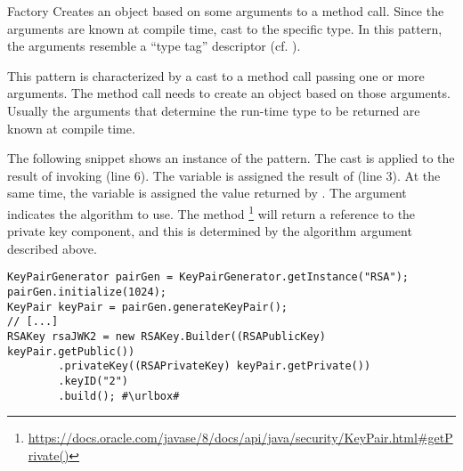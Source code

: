 \begin{pattern}{Factory}
Creates an object based on some arguments to a method call.
Since the arguments are known at compile time, cast to the specific type.
In this pattern, the arguments resemble a ``type tag'' descriptor (cf.
).

This pattern is characterized by a cast to a method call passing one or more arguments.
The method call needs to create an object based on those arguments.
Usually the arguments that determine the run-time type to be returned are known at compile time.

\instances{}
The following snippet
shows an instance of the \thisp{} pattern.
The cast is applied to the result of invoking 
(line 6).
The variable  is assigned the result of  (line 3).
At the same time, the  variable is assigned the value returned by .
The argument  indicates the algorithm to use.
The method%
\footnote{\url{https://docs.oracle.com/javase/8/docs/api/java/security/KeyPair.html\#getPrivate()}}
will return a reference to the private key component,
and this is determined by the algorithm argument described above.

\def\urlvar{http://bit.ly/connect2id_oauth_2_0_sdk_with_2HvRlUX}
\begin{verbatim}
KeyPairGenerator pairGen = KeyPairGenerator.getInstance("RSA");
pairGen.initialize(1024);
KeyPair keyPair = pairGen.generateKeyPair();
// [...]
RSAKey rsaJWK2 = new RSAKey.Builder((RSAPublicKey) keyPair.getPublic())
        .privateKey((RSAPrivateKey) keyPair.getPrivate())
        .keyID("2")
        .build(); #\urlbox#
\end{verbatim}


\end{pattern}
